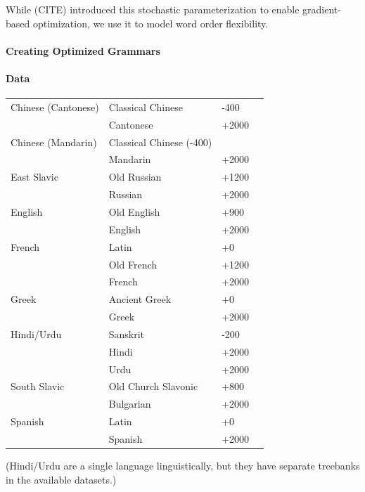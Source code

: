 \documentclass[11pt,a4paper]{article}
\begin{document}
While (CITE) introduced this stochastic parameterization to enable gradient-based optimization, we use it to model word order flexibility.

\paragraph{Creating Optimized Grammars}


\paragraph{Data}

\begin{tabular}{llll} \hline
Chinese (Cantonese) & Classical Chinese & -400  \\
& Cantonese & +2000\\ \hline
Chinese (Mandarin) & Classical Chinese (-400)  \\
& Mandarin & +2000 \\ \hline
East Slavic & Old Russian & +1200 \\
& Russian & +2000 \\ \hline
English & Old English & +900 \\
& English  & +2000\\ \hline
French & Latin &+0  \\
& Old French &+1200\\
& French  & +2000\\ \hline
Greek & Ancient Greek & +0 \\
& Greek  & +2000\\ \hline
Hindi/Urdu & Sanskrit & -200 \\
& Hindi  & +2000\\
& Urdu  & +2000\\ \hline
South Slavic & Old Church Slavonic & +800 \\
& Bulgarian  & +2000\\ \hline
Spanish & Latin &+0 \\
& Spanish  & +2000\\ \hline
\end{tabular}

(Hindi/Urdu are a single language linguistically, but they have separate treebanks in the available datasets.)


\end{document}
